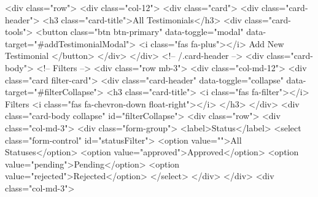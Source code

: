                 <div class="row">
                    <div class="col-12">
                        <div class="card">
                            <div class="card-header">
                                <h3 class="card-title">All Testimonials</h3>
                                <div class="card-tools">
                                    <button class="btn btn-primary" data-toggle="modal" data-target="#addTestimonialModal">
                                        <i class="fas fa-plus"></i> Add New Testimonial
                                    </button>
                                </div>
                            </div>
                            <!-- /.card-header -->
                            <div class="card-body">
                                <!-- Filters -->
                                <div class="row mb-3">
                                    <div class="col-md-12">
                                        <div class="card filter-card">
                                            <div class="card-header" data-toggle="collapse" data-target="#filterCollapse">
                                                <h3 class="card-title">
                                                    <i class="fas fa-filter"></i> Filters
                                                    <i class="fas fa-chevron-down float-right"></i>
                                                </h3>
                                            </div>
                                            <div class="card-body collapse" id="filterCollapse">
                                                <div class="row">
                                                    <div class="col-md-3">
                                                        <div class="form-group">
                                                            <label>Status</label>
                                                            <select class="form-control" id="statusFilter">
                                                                <option value="">All Statuses</option>
                                                                <option value="approved">Approved</option>
                                                                <option value="pending">Pending</option>
                                                                <option value="rejected">Rejected</option>
                                                            </select>
                                                        </div>
                                                    </div>
                                                    <div class="col-md-3">
